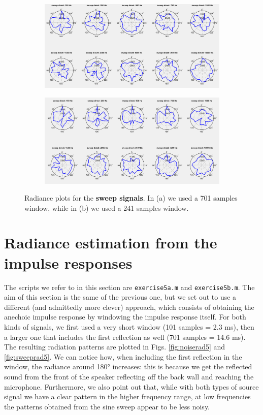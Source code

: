 \documentclass[a4paper]{article}
\begin{document}
\begin{figure}[h]
	\centering
	\begin{subfigure}{0.85\linewidth}
		\centering
		\includegraphics[width=\linewidth]{4b_radiance.png}
		\caption{}
	\end{subfigure}
	
	\begin{subfigure}{0.85\linewidth}
		\centering
		\includegraphics[width=\linewidth]{4b_radiance_120.png}
		\caption{}
	\end{subfigure}
	\caption{Radiance plots for the \textbf{sweep signals}. In (a) we used a 701 samples window, while in (b) we used a 241 samples window.}
	\label{fig:sweeprad4}
\end{figure}

\section{Radiance estimation from the impulse responses}
The scripts we refer to in this section are \verb|exercise5a.m| and \verb|exercise5b.m|. The aim of this section is the same of the previous one, but we set out to use a different (and admittedly more clever) approach, which consists of obtaining the anechoic impulse response by windowing the impulse response itself.
For both kinds of signals, we first used a very short window (101 samples = 2.3 ms), then a larger one that includes the first reflection as well (701 samples = 14.6 ms). The resulting radiation patterns are plotted in Figs. \ref{fig:noiserad5} and \ref{fig:sweeprad5}. We can notice how, when including the first reflection in the window, the radiance around 180° increases: this is because we get the reflected sound from the front of the speaker reflecting off the back wall and reaching the microphone. Furthermore, we also point out that, while with both types of source signal we have a clear  pattern in the higher frequency range, at low frequencies the patterns obtained from the sine sweep appear to be less noisy.
\end{document}
